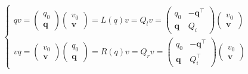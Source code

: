 \documentclass[
]{book}
\theoremstyle{definition}
\theoremstyle{definition}
\theoremstyle{definition}
\theoremstyle{definition}
\theoremstyle{remark}
\begin{document}
\[
\begin{cases}
qv=\begin{pmatrix}q_{{\scriptscriptstyle 0}}\\
\boldsymbol{q}
\end{pmatrix}\begin{pmatrix}v_{{\scriptscriptstyle 0}}\\
\boldsymbol{v}
\end{pmatrix}=L\left(q\right)v=Q_{{\scriptscriptstyle l}}v=\begin{pmatrix}q_{{\scriptscriptstyle 0}} & -\boldsymbol{q}^{\intercal}\\
\boldsymbol{q} & Q_{{\scriptscriptstyle i}}
\end{pmatrix}\begin{pmatrix}v_{{\scriptscriptstyle 0}}\\
\boldsymbol{v}
\end{pmatrix}\\
vq=\begin{pmatrix}v_{{\scriptscriptstyle 0}}\\
\boldsymbol{v}
\end{pmatrix}\begin{pmatrix}q_{{\scriptscriptstyle 0}}\\
\boldsymbol{q}
\end{pmatrix}=R\left(q\right)v=Q_{{\scriptscriptstyle r}}v=\begin{pmatrix}q_{{\scriptscriptstyle 0}} & -\boldsymbol{q}^{\intercal}\\
\boldsymbol{q} & Q_{{\scriptscriptstyle i}}^{\intercal}
\end{pmatrix}\begin{pmatrix}v_{{\scriptscriptstyle 0}}\\
\boldsymbol{v}
\end{pmatrix}
\end{cases}
\]
\end{document}
